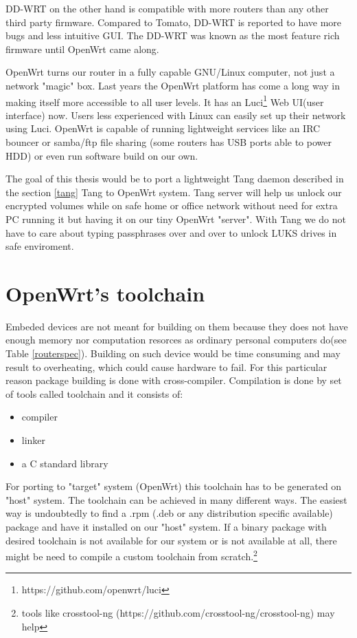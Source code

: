 DD-WRT on the other hand is compatible with more routers than any other third party firmware.
Compared to Tomato, DD-WRT is reported to have more bugs and less intuitive GUI.
The DD-WRT was known as the most feature rich firmware until OpenWrt came along.

OpenWrt turns our router in a fully capable GNU/Linux computer, not just a network "magic" box.
Last years the OpenWrt platform has come a long way in making itself more accessible to all user levels.
It has an Luci\footnote{https://github.com/openwrt/luci} Web UI(user interface) now.
Users less experienced with Linux can easily set up their network using Luci.
OpenWrt is capable of running lightweight services like an IRC bouncer or samba/ftp file sharing (some routers has USB ports able to power HDD) or even run software build on our own\cite{vpnpick}.

The goal of this thesis would be to port a lightweight Tang daemon described in the section \ref{tang} Tang to OpenWrt system.
Tang server will help us unlock our encrypted volumes while on safe home or office network without need for extra PC running it but having it on our tiny OpenWrt "server".
With Tang we do not have to care about typing passphrases over and over to unlock LUKS drives in safe enviroment.



\section{OpenWrt's toolchain}

Embeded devices are not meant for building on them because they does not have enough memory nor computation resorces as ordinary personal computers do(see Table \ref{routerspec}).
Building on such device would be time consuming and may result to overheating, which could cause hardware to fail.
For this particular reason package building is done with cross-compiler.
Compilation is done by set of tools called toolchain and it consists of:
\begin{itemize}
    \item compiler
    \item linker
    \item a C standard library
\end{itemize}
For porting to "target" system (OpenWrt) this toolchain has to be generated on "host" system.
The toolchain can be achieved in many different ways.
The easiest way is undoubtedly to find a .rpm (.deb or any distribution specific available) package and have it installed on our "host" system.
If a binary package with desired toolchain is not available for our system or is not available at all, there might be need to compile a custom toolchain from scratch.\footnote{tools like crosstool-ng (https://github.com/crosstool-ng/crosstool-ng) may help}

